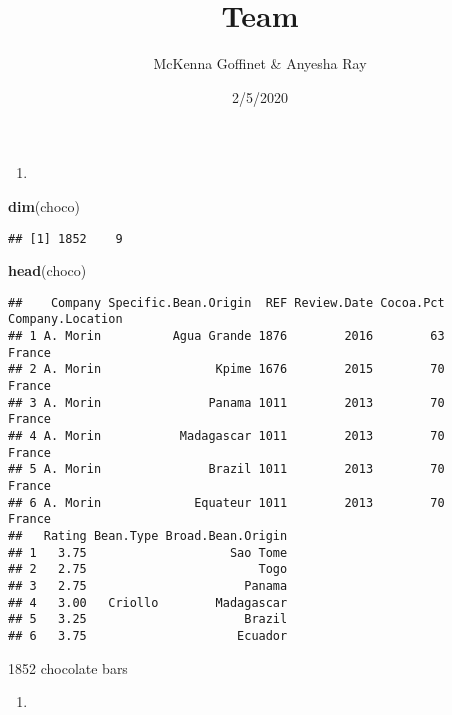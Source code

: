 \documentclass[]{article}
\title{Team}
\author{McKenna Goffinet \& Anyesha Ray}
\date{2/5/2020}
\newenvironment{Shaded}{\begin{snugshade}}{\end{snugshade}}
\newcommand{\KeywordTok}[1]{\textcolor[rgb]{0.13,0.29,0.53}{\textbf{#1}}}
\newcommand{\NormalTok}[1]{#1}
\newcommand{\OperatorTok}[1]{\textcolor[rgb]{0.81,0.36,0.00}{\textbf{#1}}}
\begin{document}
\maketitle

\begin{enumerate}
\def\labelenumi{\arabic{enumi})}
\item
\end{enumerate}

\begin{Shaded}
\begin{Highlighting}[]
\KeywordTok{dim}\NormalTok{(choco)}
\end{Highlighting}
\end{Shaded}

\begin{verbatim}
## [1] 1852    9
\end{verbatim}

\begin{Shaded}
\begin{Highlighting}[]
\KeywordTok{head}\NormalTok{(choco)}
\end{Highlighting}
\end{Shaded}

\begin{verbatim}
##    Company Specific.Bean.Origin  REF Review.Date Cocoa.Pct Company.Location
## 1 A. Morin          Agua Grande 1876        2016        63           France
## 2 A. Morin                Kpime 1676        2015        70           France
## 3 A. Morin               Panama 1011        2013        70           France
## 4 A. Morin           Madagascar 1011        2013        70           France
## 5 A. Morin               Brazil 1011        2013        70           France
## 6 A. Morin             Equateur 1011        2013        70           France
##   Rating Bean.Type Broad.Bean.Origin
## 1   3.75                    Sao Tome
## 2   2.75                        Togo
## 3   2.75                      Panama
## 4   3.00   Criollo        Madagascar
## 5   3.25                      Brazil
## 6   3.75                     Ecuador
\end{verbatim}

1852 chocolate bars

\begin{enumerate}
\def\labelenumi{\arabic{enumi})}
\setcounter{enumi}{1}
\item
\end{enumerate}

\begin{Shaded}
\end{Shaded}
\end{document}
